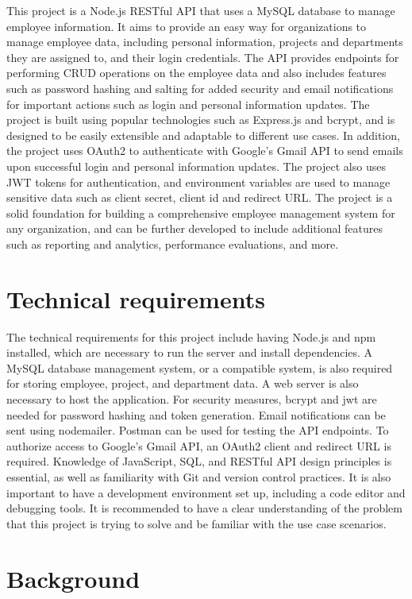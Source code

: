 \documentclass[12pt]{article}
\begin{document}
	This project is a Node.js RESTful API that uses a MySQL database to manage employee information. It aims to provide an easy way for organizations to manage employee data, including personal information, projects and departments they are assigned to, and their login credentials. The API provides endpoints for performing CRUD operations on the employee data and also includes features such as password hashing and salting for added security and email notifications for important actions such as login and personal information updates. The project is built using popular technologies such as Express.js and bcrypt, and is designed to be easily extensible and adaptable to different use cases. In addition, the project uses OAuth2 to authenticate with Google's Gmail API to send emails upon successful login and personal information updates. The project also uses JWT tokens for authentication, and environment variables are used to manage sensitive data such as client secret, client id and redirect URL. The project is a solid foundation for building a comprehensive employee management system for any organization, and can be further developed to include additional features such as reporting and analytics, performance evaluations, and more.
	\section*{Technical requirements}
	The technical requirements for this project include having Node.js and npm installed, which are necessary to run the server and install dependencies. A MySQL database management system, or a compatible system, is also required for storing employee, project, and department data. A web server is also necessary to host the application. For security measures, bcrypt and jwt are needed for password hashing and token generation. Email notifications can be sent using nodemailer. Postman can be used for testing the API endpoints. To authorize access to Google's Gmail API, an OAuth2 client and redirect URL is required. Knowledge of JavaScript, SQL, and RESTful API design principles is essential, as well as familiarity with Git and version control practices. It is also important to have a development environment set up, including a code editor and debugging tools. It is recommended to have a clear understanding of the problem that this project is trying to solve and be familiar with the use case scenarios.
	\section*{Background}
\end{document}
